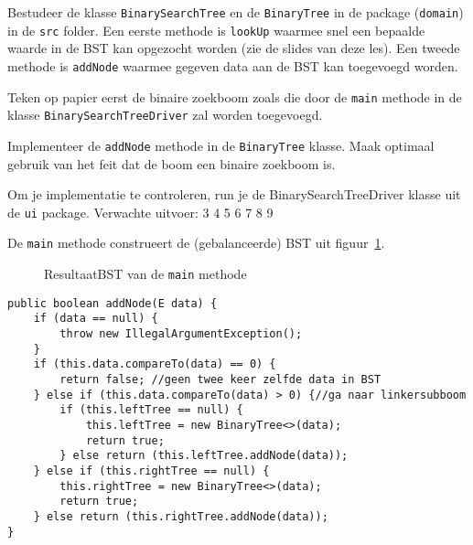 \begin{oef}
\papier \code Bestudeer de klasse \verb=BinarySearchTree= en de \verb=BinaryTree= in de package (\verb=domain=) in de \verb=src= folder.
 Een eerste  methode is \verb=lookUp= waarmee snel een bepaalde waarde in de BST kan opgezocht worden (zie de slides van deze les). Een tweede methode is \verb=addNode= waarmee gegeven data aan de BST kan toegevoegd worden.

\begin{oefenumerate}
\item Teken op papier eerst de binaire zoekboom zoals die door de \verb+main+ methode in de klasse \verb+BinarySearchTreeDriver+ zal worden toegevoegd.
\item Implementeer de \verb=addNode= methode in de \verb=BinaryTree= klasse.  Maak optimaal gebruik van het feit dat de boom een binaire zoekboom is.
\item Om je implementatie te controleren, run je de BinarySearchTreeDriver klasse uit de \verb+ui+ package. Verwachte uitvoer: 3 4 5 6 7 8 9  
\end{oefenumerate}
\begin{opl}
De \verb+main+ methode construeert de (gebalanceerde) BST uit figuur~\ref{fig:oefBSTmain}.
\begin{figure}[htbp]
    \centering
{}
\cprotect\caption{ResultaatBST van de \verb+main+ methode}
    \label{fig:oefBSTmain}
\end{figure}
\begin{lstlisting}[caption={addNode(data) methode}, label=bstaddnode]
public boolean addNode(E data) {
	if (data == null) {
		throw new IllegalArgumentException();
	}
	if (this.data.compareTo(data) == 0) {
		return false; //geen twee keer zelfde data in BST
	} else if (this.data.compareTo(data) > 0) {//ga naar linkersubboom
		if (this.leftTree == null) {
			this.leftTree = new BinaryTree<>(data);
			return true;
		} else return (this.leftTree.addNode(data));
	} else if (this.rightTree == null) {
		this.rightTree = new BinaryTree<>(data);
		return true;
	} else return (this.rightTree.addNode(data));
}
\end{lstlisting}

\end{opl}
\end{oef}


